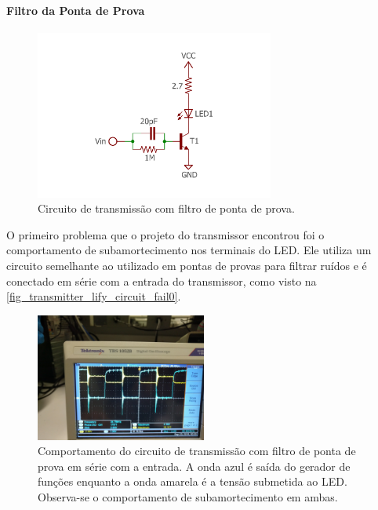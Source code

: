 	\paragraph{Filtro da Ponta de Prova}
	\begin{figure}[htb]
		\caption{\label{fig_transmitter_lify_circuit_fail0} Circuito de transmissão com filtro de ponta de prova. }
		\centering		%
		\includegraphics[width=0.7\textwidth, trim={2cm 1cm 2cm 2cm}, clip]{circuits/transmitter_fail0.pdf}
	\end{figure}
	O primeiro problema que o projeto do transmissor encontrou foi o comportamento de subamortecimento nos terminais do LED. Ele utiliza um circuito semelhante ao utilizado em pontas de provas para filtrar ruídos e é conectado em série com a entrada do transmissor, como visto na \autoref{fig_transmitter_lify_circuit_fail0}.
	\begin{figure}[htb]
		\caption{\label{fig_transmitter_lify_circuit_fail0_rl} Comportamento do circuito de transmissão com filtro de ponta de prova em série com a entrada. A onda azul é saída do gerador de funções enquanto a onda amarela é a tensão submetida ao LED. Observa-se o comportamento de subamortecimento em ambas.}
		\centering		%
		\includegraphics[width=0.5\textwidth, trim={30cm 0cm 2cm 40cm}, clip]{circuits/photos/TX_probe_result.jpg}
	\end{figure}

